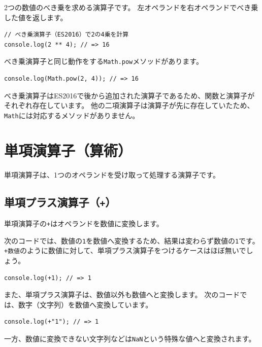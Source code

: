 2つの数値のべき乗を求める演算子です。
左オペランドを右オペランドでべき乗した値を返します。

\begin{lstlisting}
// べき乗演算子（ES2016）で2の4乗を計算
console.log(2 ** 4); // => 16
\end{lstlisting}

べき乗演算子と同じ動作をする\texttt{Math.pow}メソッドがあります。

\begin{lstlisting}
console.log(Math.pow(2, 4)); // => 16
\end{lstlisting}

べき乗演算子はES2016で後から追加された演算子であるため、関数と演算子がそれぞれ存在しています。
他の二項演算子は演算子が先に存在していたため、\texttt{Math}には対応するメソッドがありません。

\hypertarget{unary-operator}{%
\section{単項演算子（算術）}\label{unary-operator}}

単項演算子は、1つのオペランドを受け取って処理する演算子です。

\hypertarget{unary-plus-operator}{%
\subsection{\texorpdfstring{単項プラス演算子（\texttt{+}）}{単項プラス演算子（+）}}\label{unary-plus-operator}}

単項演算子の\texttt{+}はオペランドを数値に変換します。

次のコードでは、数値の\texttt{1}を数値へ変換するため、結果は変わらず数値の\texttt{1}です。
\texttt{+数値}のように数値に対して、単項プラス演算子をつけるケースはほぼ無いでしょう。

\begin{lstlisting}
console.log(+1); // => 1
\end{lstlisting}

また、単項プラス演算子は、数値以外も数値へと変換します。
次のコードでは、数字（文字列）を数値へ変換しています。

\begin{lstlisting}
console.log(+"1"); // => 1
\end{lstlisting}

一方、数値に変換できない文字列などは\texttt{NaN}という特殊な値へと変換されます。

